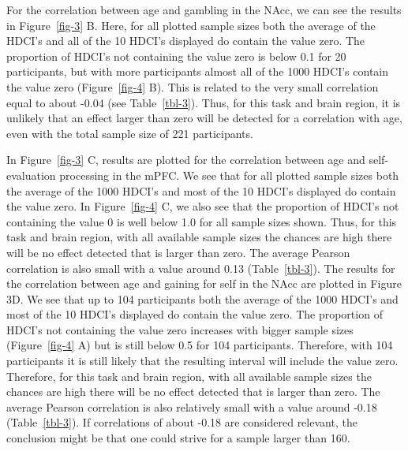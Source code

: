 \documentclass[
  letterpaper,
  DIV=11,
  numbers=noendperiod]{scrartcl}
\begin{document}
For the correlation between age and gambling in the NAcc, we can see the
results in Figure~\ref{fig-3} B. Here, for all plotted sample sizes both
the average of the HDCI's and all of the 10 HDCI's displayed do contain
the value zero. The proportion of HDCI's not containing the value zero
is below 0.1 for 20 participants, but with more participants almost all
of the 1000 HDCI's contain the value zero (Figure~\ref{fig-4} B). This
is related to the very small correlation equal to about -0.04 (see
Table~\ref{tbl-3}). Thus, for this task and brain region, it is unlikely
that an effect larger than zero will be detected for a correlation with
age, even with the total sample size of 221 participants.

In Figure~\ref{fig-3} C, results are plotted for the correlation between
age and self-evaluation processing in the mPFC. We see that for all
plotted sample sizes both the average of the 1000 HDCI's and most of the
10 HDCI's displayed do contain the value zero. In Figure~\ref{fig-4} C,
we also see that the proportion of HDCI's not containing the value 0 is
well below 1.0 for all sample sizes shown. Thus, for this task and brain
region, with all available sample sizes the chances are high there will
be no effect detected that is larger than zero. The average Pearson
correlation is also small with a value around 0.13 (Table~\ref{tbl-3}).
The results for the correlation between age and gaining for self in the
NAcc are plotted in Figure 3D. We see that up to 104 participants both
the average of the 1000 HDCI's and most of the 10 HDCI's displayed do
contain the value zero. The proportion of HDCI's not containing the
value zero increases with bigger sample sizes (Figure~\ref{fig-4} A) but
is still below 0.5 for 104 participants. Therefore, with 104
participants it is still likely that the resulting interval will include
the value zero. Therefore, for this task and brain region, with all
available sample sizes the chances are high there will be no effect
detected that is larger than zero. The average Pearson correlation is
also relatively small with a value around -0.18 (Table~\ref{tbl-3}). If
correlations of about -0.18 are considered relevant, the conclusion
might be that one could strive for a sample larger than 160.
\end{document}
